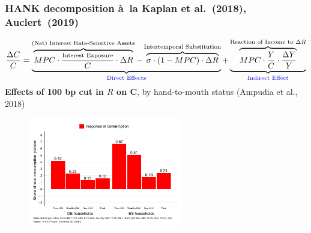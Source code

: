 \documentclass[pdflatex,aspectratio=169]{beamer}
\newcommand{\jemph}[1]{{\color{StataDarkBlue}#1}}
\newcommand{\jbemph}[1]{\textbf{\color{SlideNavy}#1}}
\begin{document}
\begin{frame}\frametitle{\bf HANK decomposition \`a\ la Kaplan et al.~(2018), Auclert~(2019)}
\vspace*{-2.5mm}
\footnotesize
$$
\frac{\Delta C}{C}=\underbrace{\overbrace{MPC\cdot\frac{\text{\scriptsize{Interest Exposure}}}{C}\cdot\Delta R}^{\text{(Net) Interest Rate-Sensitive Assets}}-\overbrace{\sigma\cdot(1-MPC)\cdot\Delta R}^{\text{Intertemporal Substitution}}}_{\text{\jemph{Direct Effects}}}+\underbrace{\overbrace{MPC\cdot\frac{Y}{C}\cdot\frac{\Delta Y}{Y}}^{\text{Reaction of Income to $\Delta R$}}}_{\text{\jemph{Indirect Effect}}}
$$
\small
\jbemph{Effects of 100 bp cut in $R$ on C}, by hand-to-mouth status (Ampudia et al., 2018)
\begin{figure}
\begin{center}
\includegraphics[width=0.6\textwidth]{./figures/cDecomp2.pdf}
\end{center}
\end{figure}
\end{frame}
\end{document}
